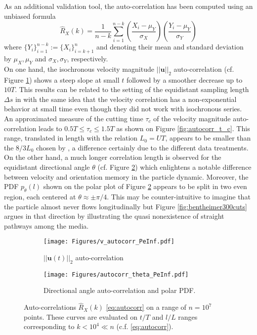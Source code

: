 As an additional validation tool, the auto-correlation has been computed using an unbiased formula
\begin{equation}
\hat R_X(k) = \frac{1}{n-k} \sum_{i=1}^{n-k} \left(\frac{X_i-\mu_Y}{\sigma_X}\right)\left(\frac{Y_i-\mu_Y}{\sigma_Y}\right)
\label{eq:autocorr}
\end{equation}
where $\{Y_i\}_{i=1}^{n-k} := \{X_{i}\}_{i=k+1}^{n}$ and denoting their mean and standard deviation by $\mu_X,\mu_Y$ and $\sigma_X, \sigma_Y$, respectively.\\
On one hand, the isochronous velocity magnitude $||\textbf{u}||_2$ auto-correlation (cf. Figure \ref{fig:autocorrv_peinf}) shows a steep slope at small $t$ followed by a smoother decrease up to $10T$.
This results can be related to the setting of the equidistant sampling length $\Delta s$ in \citet{Puyguiraud2019} with the same idea that the velocity correlation has a non-exponential behavior at small time even though they did not work with isochronous series. 
An approximated measure of the cutting time $\tau_c$ of the velocity magnitude auto-correlation leads to $0.5T \leq \tau_c \leq 1.5T$ as shown on Figure \ref{fig:autocorr_t_c}. 
This range, translated in length with the relation $L_0=U T$, appears to be smaller than the $8/3L_0$ chosen by \citet{Puyguiraud2019}, a difference certainly due to the different data treatments.\\
On the other hand, a much longer correlation length is observed for the equidistant directional angle $\theta$ (cf. Figure \ref{fig:autocorrt_peinf}) which enlightens a notable difference between velocity and orientation memory in the particle dynamic.
Moreover, the PDF $p_\theta(l)$ shown on the polar plot of Figure \ref{fig:autocorrt_peinf} appears to be split in two even region, each centered at $\theta\approx\pm\pi/4$. 
This may be counter-intuitive to imagine that the particle almost never flows longitudinally but Figure \ref{fig:bentheimer300cuts} argues in that direction by illustrating the quasi nonexistence of straight pathways among the media. \\
\begin{figure}
	\centering
	\begin{subfigure}[b]{0.49\textwidth}
		\centering
		\texttt{[image: Figures/v\_autocorr\_PeInf.pdf]}
		\caption{$||\textbf{u}(t)||_2$ auto-correlation}
		\label{fig:autocorrv_peinf}
	\end{subfigure}
	\hfill
	\begin{subfigure}[b]{0.49\textwidth}
		\centering
		\texttt{[image: Figures/autocorr\_theta\_PeInf.pdf]}
		\caption{Directional angle auto-correlation and polar PDF.}
		\label{fig:autocorrt_peinf}
	\end{subfigure}
	\caption{Auto-correlations $\hat{R}_X(k)$ \eqref{eq:autocorr} on a range of $n=10^7$ points. These curves are evaluated on $t/T$ and $l/L$ ranges corresponding to $k<10^4 \ll n$ (c.f. \eqref{eq:autocorr}).}
	\label{fig:autocorr_peinf}
\end{figure}
